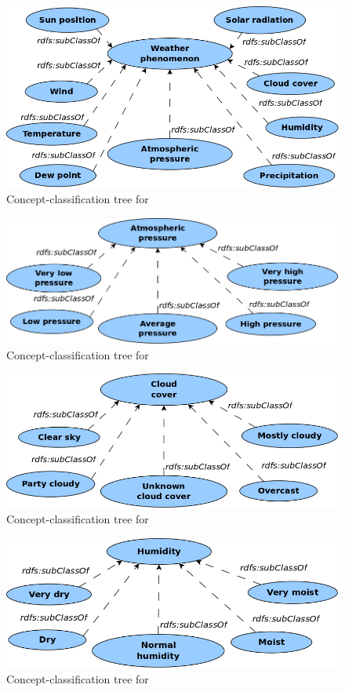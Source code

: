 \begin{figure}
  \centering
  \includegraphics[width=.8\textwidth]{figures/diagrams/weather-phenomenon.png}
  \caption{Concept-classification tree for }
  \label{fig:tree_weather_phenomenon}
\end{figure}

\begin{figure}
  \centering
  \includegraphics[width=.8\textwidth]{figures/diagrams/atmospheric-pressure.png}
  \caption{Concept-classification tree for }
  \label{fig:tree_atmospheric_pressure}
\end{figure}

\begin{figure}
  \centering
  \includegraphics[width=.8\textwidth]{figures/diagrams/cloud-cover.png}
  \caption{Concept-classification tree for }
  \label{fig:tree_cloud_cover}
\end{figure}

\begin{figure}
  \centering
  \includegraphics[width=.8\textwidth]{figures/diagrams/humidity.png}
  \caption{Concept-classification tree for }
  \label{fig:tree_humidity}
\end{figure}

